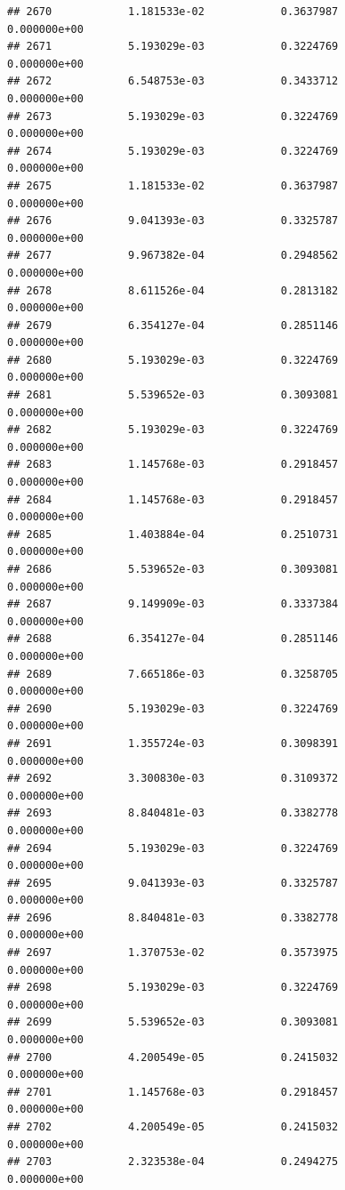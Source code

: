 \documentclass[
]{article}
\begin{document}
\begin{verbatim}
## 2670            1.181533e-02            0.3637987            0.000000e+00
## 2671            5.193029e-03            0.3224769            0.000000e+00
## 2672            6.548753e-03            0.3433712            0.000000e+00
## 2673            5.193029e-03            0.3224769            0.000000e+00
## 2674            5.193029e-03            0.3224769            0.000000e+00
## 2675            1.181533e-02            0.3637987            0.000000e+00
## 2676            9.041393e-03            0.3325787            0.000000e+00
## 2677            9.967382e-04            0.2948562            0.000000e+00
## 2678            8.611526e-04            0.2813182            0.000000e+00
## 2679            6.354127e-04            0.2851146            0.000000e+00
## 2680            5.193029e-03            0.3224769            0.000000e+00
## 2681            5.539652e-03            0.3093081            0.000000e+00
## 2682            5.193029e-03            0.3224769            0.000000e+00
## 2683            1.145768e-03            0.2918457            0.000000e+00
## 2684            1.145768e-03            0.2918457            0.000000e+00
## 2685            1.403884e-04            0.2510731            0.000000e+00
## 2686            5.539652e-03            0.3093081            0.000000e+00
## 2687            9.149909e-03            0.3337384            0.000000e+00
## 2688            6.354127e-04            0.2851146            0.000000e+00
## 2689            7.665186e-03            0.3258705            0.000000e+00
## 2690            5.193029e-03            0.3224769            0.000000e+00
## 2691            1.355724e-03            0.3098391            0.000000e+00
## 2692            3.300830e-03            0.3109372            0.000000e+00
## 2693            8.840481e-03            0.3382778            0.000000e+00
## 2694            5.193029e-03            0.3224769            0.000000e+00
## 2695            9.041393e-03            0.3325787            0.000000e+00
## 2696            8.840481e-03            0.3382778            0.000000e+00
## 2697            1.370753e-02            0.3573975            0.000000e+00
## 2698            5.193029e-03            0.3224769            0.000000e+00
## 2699            5.539652e-03            0.3093081            0.000000e+00
## 2700            4.200549e-05            0.2415032            0.000000e+00
## 2701            1.145768e-03            0.2918457            0.000000e+00
## 2702            4.200549e-05            0.2415032            0.000000e+00
## 2703            2.323538e-04            0.2494275            0.000000e+00

\end{verbatim}
\end{document}
